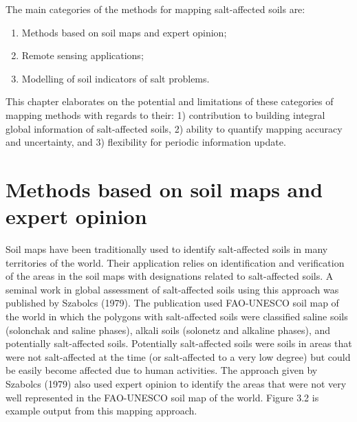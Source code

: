 \documentclass[
  10pt,
  b5paper,
]{book}
\providecommand{\tightlist}{%
  \setlength{\itemsep}{0pt}\setlength{\parskip}{0pt}}
\begin{document}
The main categories of the methods for mapping salt-affected soils are:

\begin{enumerate}
\def\labelenumi{\roman{enumi}.}
\tightlist
\item
  Methods based on soil maps and expert opinion;
\item
  Remote sensing applications;
\item
  Modelling of soil indicators of salt problems.
\end{enumerate}

This chapter elaborates on the potential and limitations of these categories of mapping methods with regards to their: 1) contribution to building integral global information of salt-affected soils, 2) ability to quantify mapping accuracy and uncertainty, and 3) flexibility for periodic information update.

\hypertarget{methods-based-on-soil-maps-and-expert-opinion}{%
\section{Methods based on soil maps and expert opinion}\label{methods-based-on-soil-maps-and-expert-opinion}}

Soil maps have been traditionally used to identify salt-affected soils in many territories of the world. Their application relies on identification and verification of the areas in the soil maps with designations related to salt-affected soils. A seminal work in global assessment of salt-affected soils using this approach was published by Szabolcs (1979). The publication used FAO-UNESCO soil map of the world in which the polygons with salt-affected soils were classified saline soils (solonchak and saline phases), alkali soils (solonetz and alkaline phases), and potentially salt-affected soils. Potentially salt-affected soils were soils in areas that were not salt-affected at the time (or salt-affected to a very low degree) but could be easily become affected due to human activities. The approach given by Szabolcs (1979) also used expert opinion to identify the areas that were not very well represented in the FAO-UNESCO soil map of the world. Figure
3.2 is example output from this mapping approach.
\end{document}
